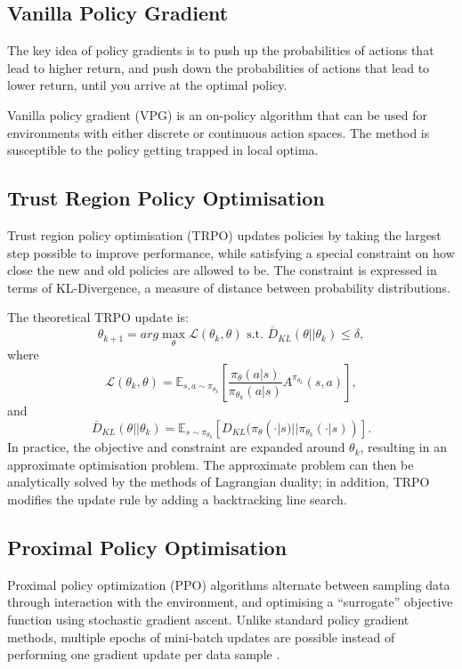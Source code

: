 \documentclass{article}
\begin{document}
\subsection{Vanilla Policy Gradient}

The key idea of policy gradients is to push up the probabilities of actions that lead to higher return, and push down the probabilities of actions that lead to lower return, until you arrive at the optimal policy.

Vanilla policy gradient (VPG) is an on-policy algorithm that can be used for environments with either discrete or continuous action spaces. The method is susceptible to the policy getting trapped in local optima.

\subsection{Trust Region Policy Optimisation}

Trust region policy optimisation (TRPO) updates policies by taking the largest step possible to improve performance, while satisfying a special constraint on how close the new and old policies are allowed to be. The constraint is expressed in terms of KL-Divergence, a measure of distance between probability distributions.

The theoretical TRPO update is: $$\theta_{k+1} = arg \max_\theta \mathcal{L}(\theta_k, \theta) \text{ s.t. } \overline{D}_{KL}(\theta || \theta_k) \leq \delta,$$ where $$\mathcal{L}(\theta_k, \theta) = \mathbb{E}_{s, a \sim \pi_{\theta_k}} \left[ \frac{\pi_\theta(a|s)}{\pi_{\theta_k}(a|s)} A^{\pi_{\theta_k}}(s,a) \right],$$ and $$ \overline{D}_{KL}(\theta||\theta_k) = \mathbb{E}_{s \sim \pi_{\theta_k}} \left[ D_{KL}(\pi_\theta(\cdot|s) || \pi_{\theta_k}(\cdot|s)) \right].$$ In practice, the objective and constraint are expanded around $\theta_k$, resulting in an approximate optimisation problem. The approximate problem can then be analytically solved by the methods of Lagrangian duality; in addition, TRPO modifies the update rule by adding a backtracking line search.  

\subsection{Proximal Policy Optimisation}

Proximal policy optimization (PPO) algorithms alternate between sampling data through interaction with the environment, and optimising a ``surrogate'' objective function using stochastic gradient ascent. Unlike standard policy gradient methods, multiple epochs of mini-batch updates are possible instead of performing one gradient update per data sample \cite{DBLP:journals/corr/SchulmanWDRK17}.
\end{document}
